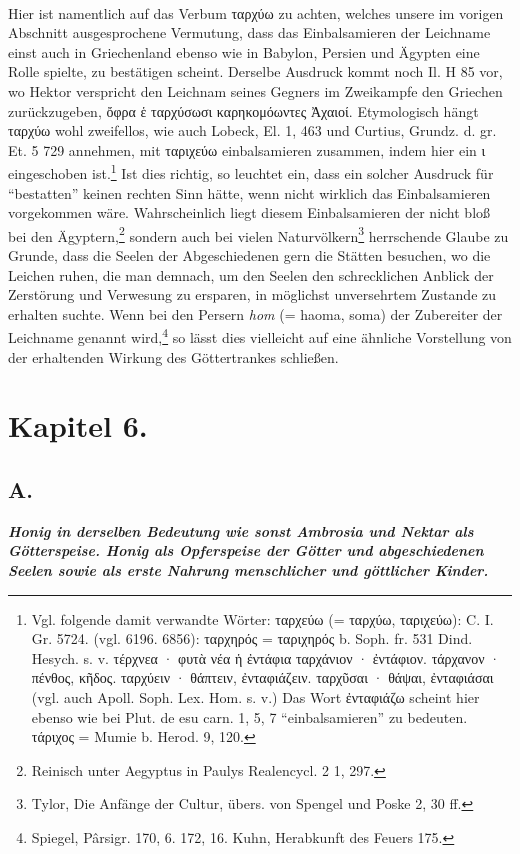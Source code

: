 \documentclass[a4paper, 11pt, oneside]{article}
\begin{document}
\paragraph{}
Hier ist namentlich auf das Verbum ταρχύω zu achten, welches unsere im vorigen Abschnitt ausgesprochene Vermutung, dass das Einbalsamieren der Leichname einst auch in Griechenland ebenso wie in Babylon, Persien und Ägypten eine Rolle spielte, zu bestätigen scheint. Derselbe Ausdruck kommt noch Il. Η 85 vor, wo Hektor verspricht den Leichnam seines Gegners im Zweikampfe den Griechen zurückzugeben, ὄφρα ἑ ταρχύσωσι καρηκομόωντες Ἀχαιοί. Etymologisch hängt ταρχύω wohl zweifellos, wie auch Lobeck, El. 1, 463 und Curtius, Grundz. d. gr. Et. 5 729 annehmen, mit ταριχεύω einbalsamieren zusammen, indem hier ein ι eingeschoben ist.\footnote{Vgl. folgende damit verwandte Wörter: ταρχεύω (= ταρχύω, ταριχεύω): C. I. Gr. 5724. (vgl. 6196. 6856): ταρχηρός = ταριχηρός b. Soph. fr. 531 Dind. Hesych. s. v. τέρχνεα · φυτὰ νέα ἡ ἐντάφια ταρχάνιον · ἐντάφιον. τάρχανον · πένθος, κῆδος. ταρχύειν · θάπτειν, ἐνταφιάζειν. ταρχῦσαι · θάψαι, ἐνταφιάσαι (vgl. auch Apoll. Soph. Lex. Hom. s. v.) Das Wort ἐνταφιάζω scheint hier ebenso wie bei Plut. de esu carn. 1, 5, 7 "`einbalsamieren"' zu bedeuten. τάριχος = Mumie b. Herod. 9, 120.} Ist dies richtig, so leuchtet ein, dass ein solcher Ausdruck für "`bestatten"' keinen rechten Sinn hätte, wenn nicht wirklich das Einbalsamieren vorgekommen wäre. Wahrscheinlich liegt diesem Einbalsamieren der nicht bloß bei den Ägyptern,\footnote{Reinisch unter Aegyptus in Paulys Realencycl. 2 1, 297.} sondern auch bei vielen Naturvölkern\footnote{Tylor, Die Anfänge der Cultur, übers. von Spengel und Poske 2, 30 ff.} herrschende Glaube zu Grunde, dass die Seelen der Abgeschiedenen gern die Stätten besuchen, wo die Leichen ruhen, die man demnach, um den Seelen den schrecklichen Anblick der Zerstörung und Verwesung zu ersparen, in möglichst unversehrtem Zustande zu erhalten suchte. Wenn bei den Persern \emph{hom} (= haoma, soma) der Zubereiter der Leichname genannt wird,\footnote{Spiegel, Pârsigr. 170, 6. 172, 16. Kuhn, Herabkunft des Feuers 175.} so lässt dies vielleicht auf eine ähnliche Vorstellung von der erhaltenden Wirkung des Göttertrankes schließen.
\clearpage
\section{Kapitel 6.}
\subsection{A.}
\begin{center}
\textbf{\emph{Honig in derselben Bedeutung wie sonst Ambrosia und Nektar als Götterspeise. Honig als Opferspeise der Götter und abgeschiedenen Seelen sowie als erste Nahrung menschlicher und göttlicher Kinder.}}
\end{center}
\end{document}
